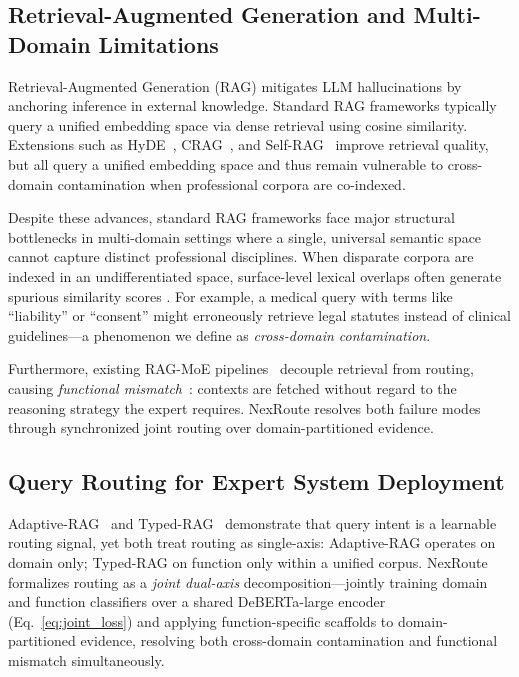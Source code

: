 \documentclass[a4paper,fleql]{cas-sc}
\begin{document}
\subsection{Retrieval-Augmented Generation and Multi-Domain Limitations}
Retrieval-Augmented Generation (RAG) \citep{lewis2020rag} mitigates LLM hallucinations by anchoring inference in external knowledge. Standard RAG frameworks typically query a unified embedding space via dense retrieval \citep{karpukhin2020dense} using cosine similarity. Extensions such as HyDE~\citep{gao2023hyde}, CRAG~\citep{yan2024crag}, and
Self-RAG~\citep{asai2023selfrag} improve retrieval quality, but all query a
unified embedding space and thus remain vulnerable to cross-domain contamination
when professional corpora are co-indexed.

Despite these advances, standard RAG frameworks face major structural bottlenecks in multi-domain settings where a single, universal semantic space cannot capture distinct professional disciplines. When disparate corpora are indexed in an undifferentiated space, surface-level lexical overlaps often generate spurious similarity scores \citep{wang2024multilingual}. For example, a medical query with terms like ``liability'' or ``consent'' might erroneously retrieve legal statutes instead of clinical guidelines—a phenomenon we define as \emph{cross-domain contamination}.

Furthermore, existing RAG-MoE pipelines~\citep{jeong2024adaptiverag,dou2024loramoe} decouple retrieval from routing, causing \emph{functional mismatch}~\citep{hu2024routerbench}: contexts are fetched without regard to the reasoning strategy the expert requires. NexRoute resolves both failure modes through synchronized joint routing over domain-partitioned evidence.

\subsection{Query Routing for Expert System Deployment}
Adaptive-RAG~\citep{jeong2024adaptiverag} and Typed-RAG~\citep{typedrag} demonstrate that query intent is a learnable routing signal, yet both treat routing as single-axis: Adaptive-RAG operates on domain only; Typed-RAG on function only within a unified corpus. NexRoute formalizes routing as a \emph{joint dual-axis} decomposition---jointly training domain and function classifiers over a shared DeBERTa-large encoder (Eq.~\ref{eq:joint_loss}) and applying function-specific scaffolds to domain-partitioned evidence, resolving both cross-domain contamination and functional mismatch simultaneously.
\end{document}

